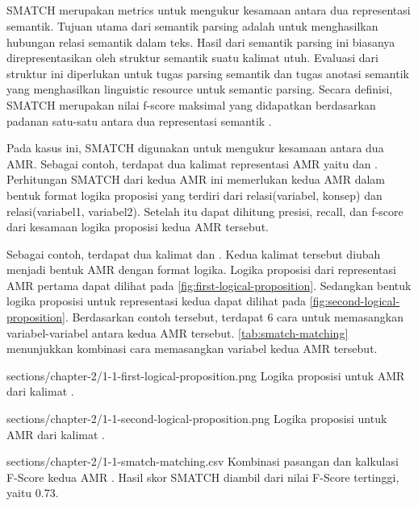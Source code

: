 \subsection{}

\gls{SMATCH} merupakan metrics untuk mengukur kesamaan antara dua representasi semantik.
Tujuan utama dari semantik parsing adalah untuk menghasilkan hubungan relasi semantik dalam teks.
Hasil dari semantik parsing ini biasanya direpresentasikan oleh struktur semantik suatu kalimat utuh.
Evaluasi dari struktur ini diperlukan untuk tugas parsing semantik dan tugas anotasi semantik yang menghasilkan linguistic resource untuk semantic parsing.
Secara definisi, \gls{SMATCH} merupakan nilai f-score maksimal yang didapatkan berdasarkan padanan satu-satu antara dua representasi semantik .

Pada kasus ini, \gls{SMATCH} digunakan untuk mengukur kesamaan antara dua \gls{AMR}.
Sebagai contoh, terdapat dua kalimat representasi \gls{AMR} yaitu  dan .
Perhitungan \gls{SMATCH} dari kedua \gls{AMR} ini memerlukan kedua \gls{AMR} dalam bentuk format logika proposisi yang terdiri dari relasi(variabel, konsep) dan relasi(variabel1, variabel2).
Setelah itu dapat dihitung presisi, recall, dan f-score dari kesamaan logika proposisi kedua \gls{AMR} tersebut.

Sebagai contoh, terdapat dua kalimat  dan .
Kedua kalimat tersebut diubah menjadi bentuk \gls{AMR} dengan format logika.
Logika proposisi dari representasi \gls{AMR} pertama dapat dilihat pada \cref{fig:first-logical-proposition}.
Sedangkan bentuk logika proposisi untuk representasi kedua dapat dilihat pada \cref{fig:second-logical-proposition}.
Berdasarkan contoh tersebut, terdapat 6 cara untuk memasangkan variabel-variabel antara kedua \gls{AMR} tersebut.
\cref{tab:smatch-matching} menunjukkan kombinasi cara memasangkan variabel kedua \gls{AMR} tersebut.

  {sections/chapter-2/1-1-first-logical-proposition.png}
  {Logika proposisi untuk \gls{AMR} dari kalimat .}

  {sections/chapter-2/1-1-second-logical-proposition.png}
  {Logika proposisi untuk \gls{AMR} dari kalimat .}

  {sections/chapter-2/1-1-smatch-matching.csv}
  {
    Kombinasi pasangan dan kalkulasi F-Score kedua \gls{AMR} .
    Hasil skor SMATCH diambil dari nilai F-Score tertinggi, yaitu 0.73.
  }

